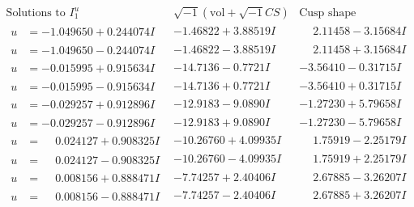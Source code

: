 \documentclass[1p]{elsarticle_modified}
\theoremstyle{definition}
\newcommand{\I}{\sqrt{-1}}
\begin{document}
$$\begin{array}{c|c|c}  
\text{Solutions to }I^u_{1}& \I (\text{vol} + \sqrt{-1}CS) & \text{Cusp shape}\\
 \hline 
\begin{aligned}
u &= -1.049650 + 0.244074 I\end{aligned}
 & -1.46822 + 3.88519 I & \phantom{-}2.11458 - 3.15684 I \\ \hline\begin{aligned}
u &= -1.049650 - 0.244074 I\end{aligned}
 & -1.46822 - 3.88519 I & \phantom{-}2.11458 + 3.15684 I \\ \hline\begin{aligned}
u &= -0.015995 + 0.915634 I\end{aligned}
 & -14.7136 - 0.7721 I & -3.56410 - 0.31715 I \\ \hline\begin{aligned}
u &= -0.015995 - 0.915634 I\end{aligned}
 & -14.7136 + 0.7721 I & -3.56410 + 0.31715 I \\ \hline\begin{aligned}
u &= -0.029257 + 0.912896 I\end{aligned}
 & -12.9183 - 9.0890 I & -1.27230 + 5.79658 I \\ \hline\begin{aligned}
u &= -0.029257 - 0.912896 I\end{aligned}
 & -12.9183 + 9.0890 I & -1.27230 - 5.79658 I \\ \hline\begin{aligned}
u &= \phantom{-}0.024127 + 0.908325 I\end{aligned}
 & -10.26760 + 4.09935 I & \phantom{-}1.75919 - 2.25179 I \\ \hline\begin{aligned}
u &= \phantom{-}0.024127 - 0.908325 I\end{aligned}
 & -10.26760 - 4.09935 I & \phantom{-}1.75919 + 2.25179 I \\ \hline\begin{aligned}
u &= \phantom{-}0.008156 + 0.888471 I\end{aligned}
 & -7.74257 + 2.40406 I & \phantom{-}2.67885 - 3.26207 I \\ \hline\begin{aligned}
u &= \phantom{-}0.008156 - 0.888471 I\end{aligned}
 & -7.74257 - 2.40406 I & \phantom{-}2.67885 + 3.26207 I \\ \hline\begin{aligned}

\end{aligned}
\end{array}$$
\end{document}
